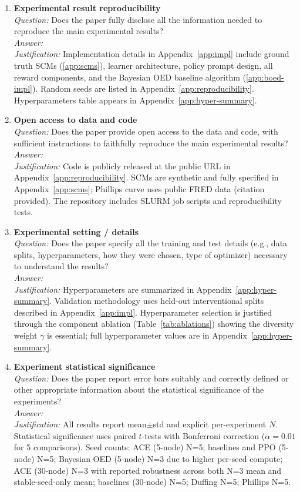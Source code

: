 \begin{enumerate}
\item \textbf{Experimental result reproducibility}\\
\emph{Question:} Does the paper fully disclose all the information needed to reproduce the main experimental results?\\
\emph{Answer:} \answerYes{}\\
\emph{Justification:} Implementation details in Appendix~\ref{app:impl} include ground truth SCMs (\ref{app:scms}), learner architecture, policy prompt design, all reward components, and the Bayesian OED baseline algorithm (\ref{app:boed-impl}). Random seeds are listed in Appendix~\ref{app:reproducibility}. Hyperparameters table appears in Appendix~\ref{app:hyper-summary}.

\item \textbf{Open access to data and code}\\
\emph{Question:} Does the paper provide open access to the data and code, with sufficient instructions to faithfully reproduce the main experimental results?\\
\emph{Answer:} \answerYes{}\\
\emph{Justification:} Code is publicly released at the public URL in Appendix~\ref{app:reproducibility}. SCMs are synthetic and fully specified in Appendix~\ref{app:scms}; Phillips curve uses public FRED data (citation provided). The repository includes SLURM job scripts and reproducibility tests.

\item \textbf{Experimental setting / details}\\
\emph{Question:} Does the paper specify all the training and test details (e.g., data splits, hyperparameters, how they were chosen, type of optimizer) necessary to understand the results?\\
\emph{Answer:} \answerYes{}\\
\emph{Justification:} Hyperparameters are summarized in Appendix~\ref{app:hyper-summary}. Validation methodology uses held-out interventional splits described in Appendix~\ref{app:impl}. Hyperparameter selection is justified through the component ablation (Table~\ref{tab:ablations}) showing the diversity weight $\gamma$ is essential; full hyperparameter values are in Appendix~\ref{app:hyper-summary}.

\item \textbf{Experiment statistical significance}\\
\emph{Question:} Does the paper report error bars suitably and correctly defined or other appropriate information about the statistical significance of the experiments?\\
\emph{Answer:} \answerYes{}\\
\emph{Justification:} All results report mean$\pm$std and explicit per-experiment $N$. Statistical significance uses paired $t$-tests with Bonferroni correction ($\alpha = 0.01$ for 5 comparisons). Seed counts: ACE (5-node) N=5; baselines and PPO (5-node) N=5; Bayesian OED (5-node) N=3 due to higher per-seed compute; ACE (30-node) N=3 with reported robustness across both N=3 mean and stable-seed-only mean; baselines (30-node) N=5; Duffing N=5; Phillips N=5.


\end{enumerate}
